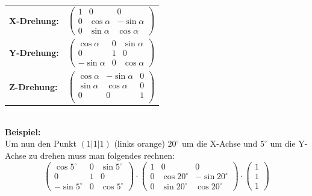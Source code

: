 \documentclass{article}
\begin{document}
\begin{titlepage}
\begin{center}
\begin{raggedright}
{		%
		\begin{tabular}{lr}
			\textbf{\footnotesize X-Drehung:}&
			$
			\left(\begin{array}{ccc}
				1 & 0 & 0 \\
				0 & \cos\alpha & -\sin\alpha\\
				0 & \sin\alpha & \cos\alpha
			\end{array}\right)
			$\\[6mm]
			\textbf{\footnotesize Y-Drehung:}&
			$
			\left(\begin{array}{ccc}
				\cos\alpha & 0 & \sin\alpha \\
				0 & 1 & 0 \\
				-\sin\alpha & 0 & \cos\alpha
			\end{array}\right)
			$\\[6mm]
			\textbf{\footnotesize Z-Drehung:}&
			$
			\left(\begin{array}{ccc}
				\cos\alpha & -\sin\alpha & 0 \\
				\sin\alpha & \cos\alpha & 0 \\
				0 & 0 & 1 \\
			\end{array}\right)
			$\\[6mm]
		\end{tabular}\\[5mm]
		\textbf{Beispiel:}\\[2mm]
		Um nun den Punkt $(1|1|1)$ (links orange) $20^\circ$ um die X-Achse und $5^\circ$ um die Y-Achse zu drehen muss man folgendes rechnen:\\[2mm]
		\[
		\left(\begin{array}{ccc}
			\cos 5^\circ & 0 & \sin 5^\circ \\
			0 & 1 & 0 \\
			-\sin 5^\circ & 0 & \cos 5^\circ
		\end{array}\right)
		\cdot
		\left(\begin{array}{ccc}
			1 & 0 & 0 \\
			0 & \cos 20^\circ & -\sin 20^\circ\\
			0 & \sin 20^\circ & \cos 20^\circ
		\end{array}\right)
		\cdot
		\left(\begin{array}{ccc}
			1\\1\\1
		\end{array}\right)
		\]
	}
\end{raggedright}


\end{center}
\end{titlepage}
\end{document}
